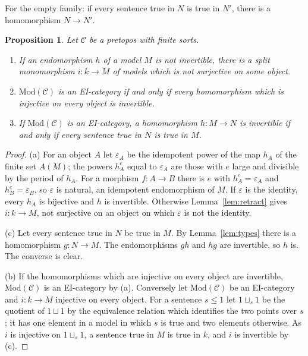 \documentclass[11pt]{amsart}
\newtheorem{prop}[thm]{Proposition}
\theoremstyle{definition}
\newcommand{\Mod}{\mathrm{Mod}}
\newcommand{\cC}{\mathcal C}
\begin{document}
For the empty family: if every sentence true in $N$ is true in $N'$,
there is a homomorphism $N\to N'$.

\begin{prop}\label{prop:EI}
Let $\cC$ be a pretopos with finite sorts.
\begin{enumerate}
\item[(a)] If an endomorphism $h$ of a model $M$ is not invertible,
there is a split monomorphism $i\colon k\to M$ of models which is not
surjective on some object.
\item[(b)] $\Mod(\cC)$ is an EI-category if and only if every
homomorphism which is injective on every object is invertible.
\item[(c)] If $\Mod(\cC)$ is an EI-category, a homomorphism $h\colon
M\to N$ is invertible if and only if every sentence true in $N$ is
true in $M$.
\end{enumerate}
\end{prop}
\begin{proof}
(a) For an object $A$ let $\varepsilon_A$ be the idempotent power of
the map $h_A$ of the finite set $A(M)$; the powers $h_A^e$ equal to
$\varepsilon_A$ are those with $e$ large and divisible by the period
of $h_A$. For a morphism $f\colon A\to B$ there is $e$ with $h_A^e=
\varepsilon_A$ and $h_B^e=\varepsilon_B$, so $\varepsilon$ is natural,
an idempotent endomorphism of $M$. If $\varepsilon$ is the identity,
every $h_A$ is bijective and $h$ is invertible. Otherwise
Lemma~\ref{lem:retract} gives $i\colon k\to M$, not surjective on an
object on which $\varepsilon$ is not the identity.

(c) Let every sentence true in $N$ be true in $M$. By
Lemma~\ref{lem:types} there is a homomorphism $g\colon N\to M$. The
endomorphisms $gh$ and $hg$ are invertible, so $h$ is. The converse is
clear.

(b) If the homomorphisms which are injective on every object are
invertible, $\Mod(\cC)$ is an EI-category by (a). Conversely let
$\Mod(\cC)$ be an EI-category and $i\colon k\to M$ injective on every
object. For a sentence $s\le1$ let $1\sqcup_s1$ be the quotient of
$1\sqcup1$ by the equivalence relation which identifies the two
points over $s$; it has one element in a model in which $s$ is true
and two elements otherwise. As $i$ is injective on $1\sqcup_s1$, a
sentence true in $M$ is true in $k$, and $i$ is invertible by (c).
\end{proof}
\end{document}
